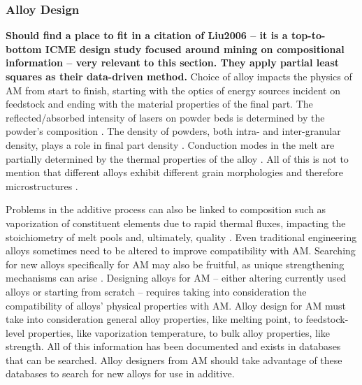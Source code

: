 \subsubsection{Alloy Design}
\textbf{Should find a place to fit in a citation of Liu2006 \cite{Liu2006} -- it is a top-to-bottom ICME design study focused around mining on compositional information -- very relevant to this section. They apply partial least squares as their data-driven method.}  
Choice of alloy impacts the physics of AM from start to finish, starting with the optics of energy sources incident on feedstock and ending with the material properties of the final part. The reflected/absorbed intensity of lasers on powder beds is determined by the powder's composition \cite{Boley2016, Trapp2017}. The density of powders, both intra- and inter-granular density, plays a role in final part density \cite{Bi2013}. Conduction modes in the melt are partially determined by the thermal properties of the alloy \cite{Martin2017}. All of this is not to mention that different alloys exhibit different grain morphologies and therefore microstructures \cite{Collins2016}. 

Problems in the additive process can also be linked to composition such as vaporization of constituent elements due to rapid thermal fluxes, impacting the stoichiometry of melt pools and, ultimately, quality \cite{Brice2018}. Even traditional engineering alloys sometimes need to be altered to improve compatibility with AM. Searching for new alloys specifically for AM may also be fruitful, as unique strengthening mechanisms can arise \cite{Brice2018, Wang2017}. Designing alloys for AM -- either altering currently used alloys or starting from scratch -- requires taking into consideration the compatibility of alloys' physical properties with AM. Alloy design for AM must take into consideration general alloy properties, like melting point, to feedstock-level properties, like vaporization temperature, to bulk alloy properties, like strength. All of this information has been documented and exists in databases that can be searched. Alloy designers from AM should take advantage of these databases to search for new alloys for use in additive. 

